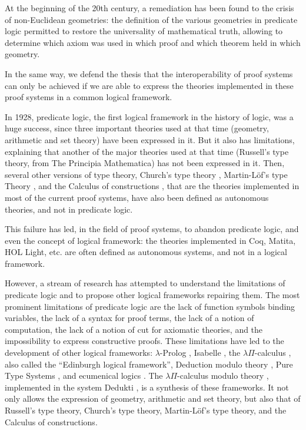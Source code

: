 At the beginning of the 20th century, a remediation has been found to
the crisis of non-Euclidean geometries: the definition of the various
geometries in predicate logic \cite{HilbertAckermann} permitted to
restore the universality of mathematical truth, allowing to determine
which axiom was used in which proof and which theorem held in
which geometry.

In the same way, we defend the thesis that the interoperability of
proof systems can only be achieved if we are able to express the theories
implemented in these proof systems in a common logical framework.

In 1928, predicate logic, the first logical framework in the history
of logic, was a huge success, since three important theories used at
that time (geometry, arithmetic and set theory) have been expressed in
it. But it also has limitations, explaining that another of the major
theories used at that time (Russell's type theory, from The Principia
Mathematica) has not been expressed in it.  Then, several other
versions of type theory, Church's type theory \cite{Church40},
Martin-L\"of's type Theory \cite{Martin-Lof84}, and the Calculus of
constructions \cite{CoquandHuet88}, that are the theories implemented
in most of the current proof systems, have also been defined as
autonomous theories, and not in predicate logic.

This failure has led, in the field of proof systems, to abandon
predicate logic, and even the concept of logical framework: the
theories implemented in {\sc Coq}, {\sc Matita}, {\sc HOL Light},
etc. are often defined as autonomous systems, and not in a logical
framework.

However, a stream of research has attempted to understand the
limitations of predicate logic and to propose other logical frameworks
repairing them. The most prominent limitations of predicate logic are
the lack of function symbols binding variables, the lack of a syntax
for proof terms, the lack of a notion of computation, the lack of a
notion of cut for axiomatic theories, and the impossibility to express
constructive proofs. These limitations have led to the development of
other logical frameworks: $\lambda$-Prolog \cite{NadathurMiller88,
  MillerNadathur12}, Isabelle \cite{Paulson90}, the $\lambda
\Pi$-calculus \cite{HarperHonsellPlotkin91}, also called the
``Edinburgh logical framework'', Deduction modulo theory
\cite{DowekHardinKirchner03, DowekWerner03}, Pure Type Systems
\cite{Berardi88,Terlouw89}, and ecumenical logics
\cite{Prawitz15,Dowek15,PereiraRodriguez17}. The $\lambda
\Pi$-calculus modulo theory \cite{CousineauDowek07}, implemented in
the system {\sc Dedukti} \cite{Assaf16}, is a synthesis of these
frameworks. It not only allows the expression of geometry, arithmetic
and set theory, but also that of Russell's type theory, Church's type
theory, Martin-L\"of's type theory, and the Calculus of constructions.

